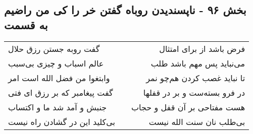 \begin{center}
\section*{بخش ۹۶ - ناپسندیدن روباه گفتن خر را کی من راضیم به قسمت}
\label{sec:sh096}
\begin{longtable}{l p{0.5cm} r}
گفت روبه جستن رزق حلال
&&
فرض باشد از برای امتثال
\\
عالم اسباب و چیزی بی‌سبب
&&
می‌نباید پس مهم باشد طلب
\\
وابتغوا من فضل الله است امر
&&
تا نباید غصب کردن هم‌چو نمر
\\
گفت پیغامبر که بر رزق ای فتی
&&
در فرو بسته‌ست و بر در قفلها
\\
جنبش و آمد شد ما و اکتساب
&&
هست مفتاحی بر آن قفل و حجاب
\\
بی‌کلید این در گشادن راه نیست
&&
بی‌طلب نان سنت الله نیست
\\
\end{longtable}
\end{center}
